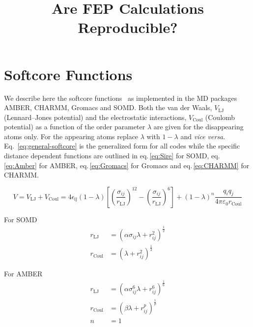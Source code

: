\documentclass[journal=jctcce,manuscript=suppinfo]{achemso}
\title{Are FEP Calculations Reproducible?}
\begin{document}
\maketitle



\section{Softcore Functions}
\label{sec:softcores}

We describe here the softcore functions~\cite{beutler_avoiding_1994,
  zacharias_separationshifted_1994} as implemented in the MD packages
AMBER, CHARMM, Gromacs and SOMD.  Both the van der Waals,
$V_{\mathrm{LJ}}$ (Lennard--Jones potential) and the electrostatic
interactions, $V_{\mathrm{Coul}}$ (Coulomb potential) as a function of
the order parameter $\lambda$ are given for the disappearing atoms
only.  For the appearing atoms replace $\lambda$ with $1 - \lambda$
and \emph{vice versa}.  Eq.\ \eqref{eq:general-softcore} is the generalized
form for all codes while the specific distance dependent functions are
outlined in eq.\,\eqref{eq:Sire} for SOMD, eq.\,\eqref{eq:Amber} for
AMBER, eq.\,\eqref{eq:Gromacs} for Gromacs and eq.\,\eqref{eq:CHARMM}
for CHARMM.

\begin{equation}
  V = V_{\mathrm{LJ}} + V_{\mathrm{Coul}} =
  4\epsilon_{\mathrm{ij}}(1 - \lambda) \left[ \left(
      \frac{\sigma_{ij}}{{r_{\mathrm{LJ}}}}
    \right)^{12} - \left(
      \frac{\sigma_{ij}}{{r_{\mathrm{LJ}}}} \right)^{
      6} \right] +
  (1 - \lambda)^{n} \frac{q_{i}q_{j}}
  {4\pi\varepsilon_{0}{r_{\mathrm{Coul}}}}
  \label{eq:general-softcore}
\end{equation}

For SOMD
\begin{equation}
  \begin{split}
    r_{\mathrm{LJ}} &= (\alpha\sigma_{ij}\lambda + r_{ij}^2)^{\frac{1}{2}} \\
    r_{\mathrm{Coul}} &=  (\lambda + r_{ij}^2)^{\frac{1}{2}}
  \end{split}
  \label{eq:Sire}
\end{equation}

For AMBER
\begin{equation}
  \begin{split}
    r_{\mathrm{LJ}} &= (\alpha \sigma_{ij}^{6} \lambda + %
                         r_{ij}^6)^{\frac{1}{6}} \\
    r_{\mathrm{Coul}} &= (\beta\lambda + r_{ij}^{p})^{\frac{1}{p}} \\
    n &= 1
  \end{split}
  \label{eq:Amber}
\end{equation}
\end{document}
